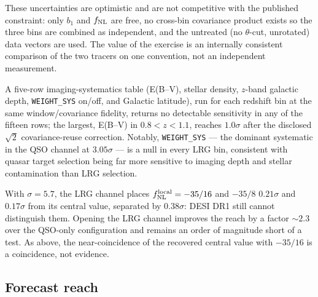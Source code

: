 \documentclass[aps,prd,twocolumn,superscriptaddress,nofootinbib,longbibliography]{revtex4-2}
\newcommand{\fnl}{f_{\rm NL}}
\newcommand{\fnlloc}{f_{\rm NL}^{\rm local}}
\begin{document}
These uncertainties are optimistic and are not competitive with the
published constraint: only $b_1$ and $\fnl$ are free, no cross-bin
covariance product exists so the three bins are combined as independent,
and the untreated (no $\theta$-cut, unrotated) data vectors are used. The
value of the exercise is an internally consistent comparison of the two
tracers on one convention, not an independent measurement.

A five-row imaging-systematics table (E(B--V), stellar density, $z$-band
galactic depth, \texttt{WEIGHT\_SYS} on/off, and Galactic latitude), run
for each redshift bin at the same window/covariance fidelity, returns no
detectable sensitivity in any of the fifteen rows; the largest, E(B--V) in
$0.8<z<1.1$, reaches $1.0\sigma$ after the disclosed $\sqrt2$
covariance-reuse correction. Notably, \texttt{WEIGHT\_SYS} --- the
dominant systematic in the QSO channel at $3.05\sigma$ --- is a null in
every LRG bin, consistent with quasar target selection being far more
sensitive to imaging depth and stellar contamination than LRG selection.

With $\sigma=5.7$, the LRG channel places $\fnlloc=-35/16$ and $-35/8$
$0.21\sigma$ and $0.17\sigma$ from its central value, separated by
$0.38\sigma$: DESI DR1 still cannot distinguish them. Opening the LRG
channel improves the reach by a factor $\sim2.3$ over the QSO-only
configuration and remains an order of magnitude short of a test. As
above, the near-coincidence of the recovered central value with $-35/16$
is a coincidence, not evidence.

\subsection{Forecast reach}
\end{document}
